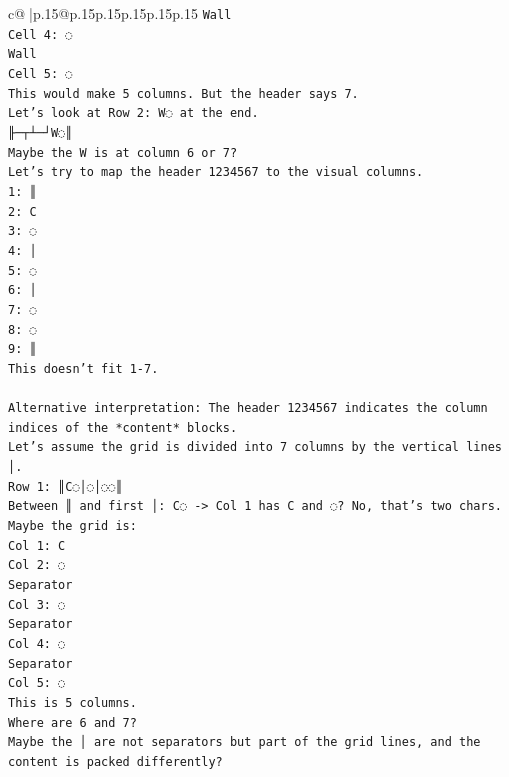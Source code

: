\documentclass{article}
\begin{document}
{\begin{supertabular}{c@{$\;$}|p{.15\linewidth}@{}p{.15\linewidth}p{.15\linewidth}p{.15\linewidth}p{.15\linewidth}p{.15\linewidth}}
{{{\texttt{Wall} \\
\texttt{Cell 4: ◌} \\
\texttt{Wall} \\
\texttt{Cell 5: ◌} \\
\texttt{This would make 5 columns. But the header says 7.} \\
\texttt{Let's look at Row 2: W◌ at the end.} \\
\texttt{╟─┬┴─┘W◌║} \\
\texttt{Maybe the W is at column 6 or 7?} \\
\texttt{Let's try to map the header 1234567 to the visual columns.} \\
\texttt{1: ║} \\
\texttt{2: C} \\
\texttt{3: ◌} \\
\texttt{4: │} \\
\texttt{5: ◌} \\
\texttt{6: │} \\
\texttt{7: ◌} \\
\texttt{8: ◌} \\
\texttt{9: ║} \\
\texttt{This doesn't fit 1{-}7.} \\
\\ 
\texttt{Alternative interpretation: The header 1234567 indicates the column indices of the *content* blocks.} \\
\texttt{Let's assume the grid is divided into 7 columns by the vertical lines │.} \\
\texttt{Row 1: ║C◌│◌│◌◌║} \\
\texttt{Between ║ and first │: C◌ {-}> Col 1 has C and ◌? No, that's two chars.} \\
\texttt{Maybe the grid is:} \\
\texttt{Col 1: C} \\
\texttt{Col 2: ◌} \\
\texttt{Separator} \\
\texttt{Col 3: ◌} \\
\texttt{Separator} \\
\texttt{Col 4: ◌} \\
\texttt{Separator} \\
\texttt{Col 5: ◌} \\
\texttt{This is 5 columns.} \\
\texttt{Where are 6 and 7?} \\
\texttt{Maybe the │ are not separators but part of the grid lines, and the content is packed differently?} \\
}}}
\end{supertabular}}
\end{document}
